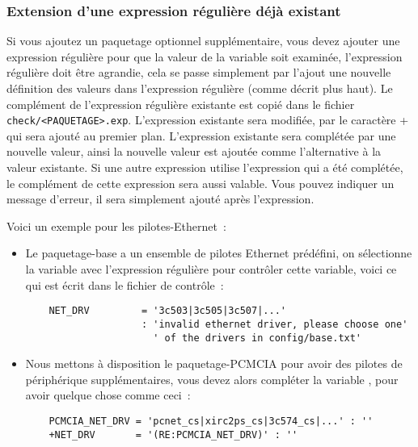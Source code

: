 \subsubsection{Extension d’une expression régulière déjà existant}

Si vous ajoutez un paquetage optionnel supplémentaire, vous devez ajouter une
expression régulière pour que la valeur de la variable soit examinée,
l'expression régulière doit être agrandie, cela se passe simplement par l’ajout
une nouvelle définition des valeurs dans l’expression régulière (comme décrit
plus haut). Le complément de l'expression régulière existante est copié dans le
fichier \texttt{check/<PAQUETAGE>.exp}. L’expression existante sera modifiée, par
le caractère \og{}+\fg{} qui sera ajouté au premier plan. L’expression existante sera
complétée par une nouvelle valeur, ainsi la nouvelle valeur est ajoutée comme
l'alternative à la valeur existante. Si une autre expression utilise l'expression
qui a été complétée, le complément de cette expression sera aussi valable. Vous
pouvez indiquer un message d'erreur, il sera simplement ajouté après l’expression.

Voici un exemple pour les pilotes-Ethernet~:

\begin{itemize}
\item Le paquetage-base a un ensemble de pilotes Ethernet prédéfini, on sélectionne
la variable  avec l'expression régulière  pour
contrôler cette variable, voici ce qui est écrit dans le fichier de contrôle~:

\begin{example}
\begin{verbatim}
    NET_DRV         = '3c503|3c505|3c507|...'
                    : 'invalid ethernet driver, please choose one'
                      ' of the drivers in config/base.txt'
\end{verbatim}
\end{example}
\item Nous mettons à disposition le paquetage-PCMCIA pour avoir des pilotes de
  périphérique supplémentaires, vous devez alors compléter la variable
  , pour avoir quelque chose comme ceci~:

\begin{example}
\begin{verbatim}
    PCMCIA_NET_DRV = 'pcnet_cs|xirc2ps_cs|3c574_cs|...' : ''
    +NET_DRV       = '(RE:PCMCIA_NET_DRV)' : ''
\end{verbatim}
\end{example}
\end{itemize}

